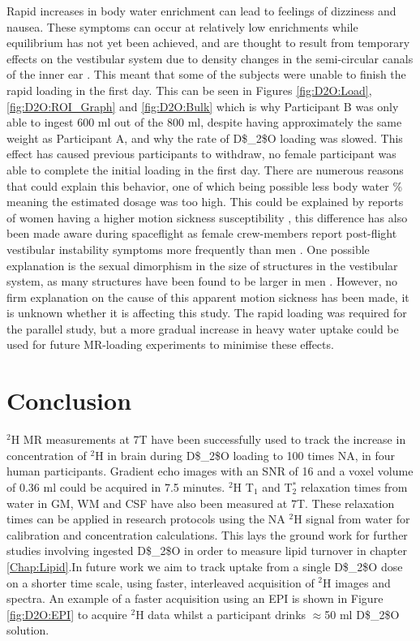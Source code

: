 Rapid increases in body water enrichment can lead to feelings of dizziness and nausea. These symptoms can occur at relatively low enrichments while equilibrium has not yet been achieved, and are thought to result from temporary effects on the vestibular system due to density changes in the semi-circular canals of the inner ear \cite{Money1974HeavyAlcohol}. This meant that some of the subjects were unable to finish the rapid loading in the first day. This can be seen in Figures \ref{fig:D2O:Load}, \ref{fig:D2O:ROI_Graph} and \ref{fig:D2O:Bulk} which is why Participant B was only able to ingest 600 ml out of the 800 ml, despite having approximately the same weight as Participant A, and why the rate of \ac{D$_2$O} loading was slowed. This effect has caused previous participants to withdraw, no female participant was able to complete the initial loading in the first day. There are numerous reasons that could explain this behavior, one of which being possible less body water \% meaning the estimated dosage was too high. This could be explained by reports of women having a higher motion sickness susceptibility \cite{Flanagan2005SexSickness.}, this difference has also been made aware during spaceflight as female crew-members report post-flight vestibular instability symptoms more frequently than men \cite{Reschke2014EffectsSystems}. One possible explanation is the sexual dimorphism in the size of structures in the vestibular system, as many structures have been found to be larger in men \cite{Sato2016Computer-AidedApparatus}. However, no firm explanation on the cause of this apparent motion sickness has been made, it is unknown whether it is affecting this study. The rapid loading was required for the parallel study, but a more gradual increase in heavy water uptake could be used for future MR-loading experiments to minimise these effects. 

\section{Conclusion}

$^2$H MR measurements at 7T have been successfully used to track the increase in concentration of $^2$H in brain during \ac{D$_2$O} loading to 100 times \ac{NA}, in four human participants. Gradient echo images with an \ac{SNR} of 16 and a voxel volume of 0.36 ml could be acquired in 7.5 minutes. $^2$H T$_1$ and T$_2^*$ relaxation times from water in \ac{GM}, \ac{WM} and \ac{CSF} have also been measured at 7T. These relaxation times can be applied in research protocols using the \ac{NA} $^2$H signal from water for calibration and concentration calculations. This lays the ground work for further studies involving ingested \ac{D$_2$O} in order to measure lipid turnover in chapter \ref{Chap:Lipid}.In future work we aim to track uptake from a single \ac{D$_2$O} dose on a shorter time scale, using faster, interleaved acquisition of $^2$H images and spectra. An example of a faster acquisition using an \ac{EPI} is shown in Figure \ref{fig:D2O:EPI} to acquire $^2$H data whilst a participant drinks $\approx$50 ml \ac{D$_2$O} solution.

